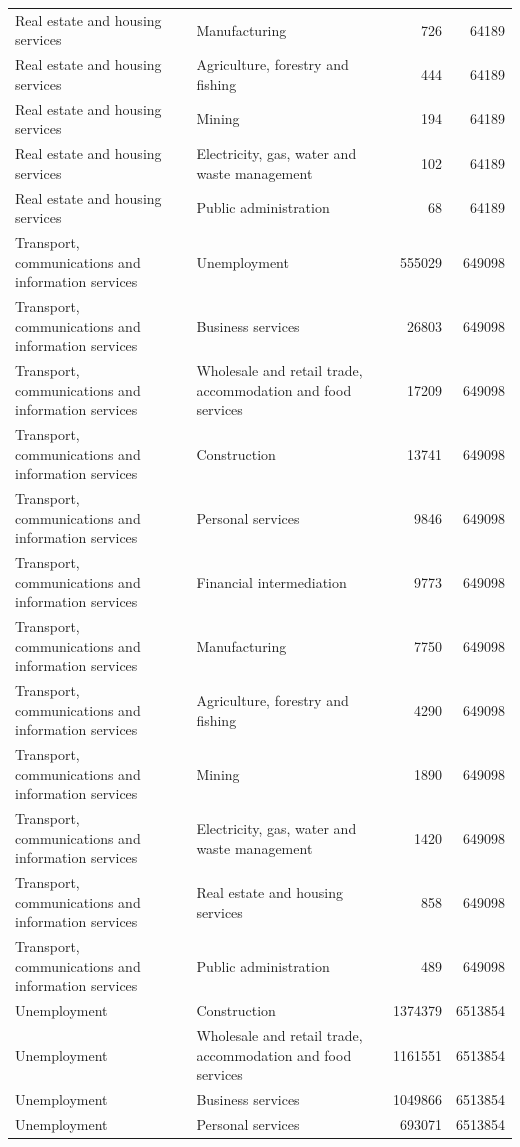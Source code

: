 \begin{longtable}{llrr}
Real estate and housing services & Manufacturing & 726 & 64189 \\
Real estate and housing services & Agriculture, forestry and fishing & 444 & 64189 \\
Real estate and housing services & Mining & 194 & 64189 \\
Real estate and housing services & Electricity, gas, water and waste management & 102 & 64189 \\
Real estate and housing services & Public administration & 68 & 64189 \\
Transport, communications and information services & Unemployment & 555029 & 649098 \\
Transport, communications and information services & Business services & 26803 & 649098 \\
Transport, communications and information services & Wholesale and retail trade, accommodation and food services & 17209 & 649098 \\
Transport, communications and information services & Construction & 13741 & 649098 \\
Transport, communications and information services & Personal services & 9846 & 649098 \\
Transport, communications and information services & Financial intermediation & 9773 & 649098 \\
Transport, communications and information services & Manufacturing & 7750 & 649098 \\
Transport, communications and information services & Agriculture, forestry and fishing & 4290 & 649098 \\
Transport, communications and information services & Mining & 1890 & 649098 \\
Transport, communications and information services & Electricity, gas, water and waste management & 1420 & 649098 \\
Transport, communications and information services & Real estate and housing services & 858 & 649098 \\
Transport, communications and information services & Public administration & 489 & 649098 \\
Unemployment & Construction & 1374379 & 6513854 \\
Unemployment & Wholesale and retail trade, accommodation and food services & 1161551 & 6513854 \\
Unemployment & Business services & 1049866 & 6513854 \\
Unemployment & Personal services & 693071 & 6513854 \\

\end{longtable}
